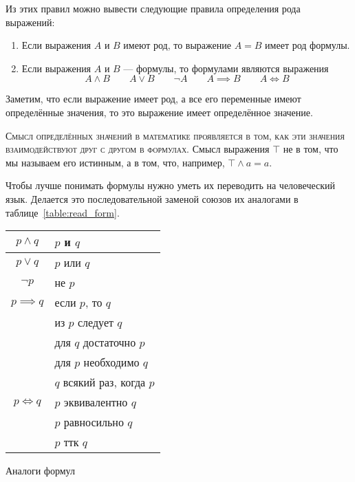 Из этих правил можно вывести следующие правила определения рода выражений:
\begin{enumerate}
	\item{}Если выражения $A$ и $B$ имеют род,
	то выражение $A=B$ имеет род формулы.

	\item{}Если выражения $A$ и $B$ --- формулы, то формулами являются выражения
	\[
		A\land B\qquad A\lor B\qquad \lnot A\qquad A\implies B\qquad A\iff B
	\]
\end{enumerate}

Заметим, что если выражение имеет род, а все его переменные
имеют определённые значения, то это выражение имеет определённое значение.

\textsc{Смысл определённых значений в математике проявляется в том,
	как эти значения взаимодействуют
	друг с другом в формулах.}
Смысл выражения $\top$ не в том, что мы называем его истинным,
а в том, что, например, $\top\land a=a$.


Чтобы лучше понимать формулы нужно уметь их переводить на человеческий язык. Делается
это последовательной заменой союзов их аналогами в таблице~\ref{table:read_form}.
\begin{margintable}
	\begin{tabular}{cl}
		$p\land q$    & $p$ и $q$                 \\\hline
		$p\lor q$     & $p$ или $q$               \\\hline
		$\lnot p$     & не $p$                    \\\hline
		$p\implies q$ & если $p$, то $q$          \\
		              & из $p$ следует $q$        \\
		              & для $q$ достаточно $p$    \\
		              & для $p$ необходимо $q$    \\
		              & $q$ всякий раз, когда $p$ \\\hline
		$p\iff q$     & $p$ эквивалентно $q$      \\
		              & $p$ равносильно $q$       \\
		              & $p$ ттк $q$
	\end{tabular}
	\caption{Аналоги формул}\label{table:read_form}
\end{margintable}

